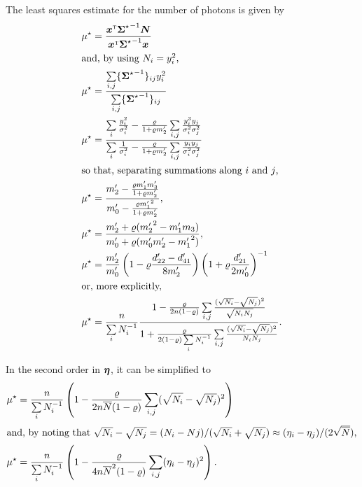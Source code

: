 \documentclass{pasa}
\begin{document}
The least squares estimate for the number of photons is given by
\begin{align*}
    \mu^\star &= \frac { {\boldsymbol{x}}^\text{\textsc{t}}{\ensuremath{\boldsymbol{\Sigma}}^\star}^{-1} \boldsymbol{N} }
                        { {\boldsymbol{x}}^\text{\textsc{t}}{\ensuremath{\boldsymbol{\Sigma}}^\star}^{-1} \boldsymbol{x} }\\
\intertext{and, by using $N_i = y_i^2$,}
    \mu^\star &= \frac{\sum\limits_{i,j} \{ {\boldsymbol{\Sigma}^\star}^{-1} \}_{ij} y_i^2} 
                       {\sum\limits_{i,j} \{ {\boldsymbol{\Sigma}^\star}^{-1} \}_{ij} }\\
    \mu^\star &= \frac{\sum\limits_i \frac{y_i^2}{\sigma_i^2}
                     -  \frac{\varrho}{1+ \varrho m'_2} 
                \sum\limits_{i,j} \frac{y_i^3y_j}{\sigma_i^2\sigma_j^2}}
                  {\sum\limits_i \frac 1{\sigma_i^2}
                     -  \frac{\varrho}{1+ \varrho m'_2} 
                \sum\limits_{i,j} \frac{y_iy_j}{\sigma_i^2\sigma_j^2}}\\
\intertext{so that, separating summations along $i$ and $j$,}
    \mu^\star &= \frac{m'_2 - \frac{\varrho m'_1m'_3}{1 + \varrho m'_2}}
                       {m'_0 - \frac{\varrho {m'_1}^2}{1 + \varrho m'_2}},\\
    \mu^\star &= \frac{m'_2 + \varrho({m'_2}^2 - m'_1m_3)}
                       {m'_0 + \varrho(m'_0m'_2 - {m'_1}^2)},\\
    \mu^\star &= \frac{m'_2}{m'_0} 
                    \left(1 - \varrho\frac{d'_{22} - d'_{41}}{8m'_2}\right)
                    \left(1 + \varrho\frac{d'_{21}}         {2m'_0}\right)^{-1}\\
\intertext{or, more explicitly,}
    \mu^\star &= \frac n{\sum\limits_i N_i^{-1}}
                  \frac{ 
                     1 - \frac{\varrho}{2n(1-\varrho)} 
                     \sum\limits_{i,j} 
                        \frac{(\sqrt{N_i}-\sqrt{N_j})^2}{\sqrt{N_i N_j}} 
                  }{ 1  + \frac{\varrho}{2(1-\varrho)\sum\limits_i N_i^{-1}} 
                     \sum\limits_{i,j} 
                        \frac{(\sqrt{N_i} - \sqrt{N_j})^2}{N_iN_j}}
                                  . 
\end{align*}


In the second order in $\boldsymbol{\eta}$, it can be simplified to
\begin{align*}
   \mu^\star &= \frac n{\sum\limits_i N_i^{-1}}
                    \left( 1 
            - \frac{\varrho}{2n\overline{N}(1-\varrho)} 
                \sum_{i,j} (\sqrt{N_i}-\sqrt{N_j})^2 \right)
\\
\intertext{and, by noting that $\sqrt{N_i} - \sqrt{N_j} = (N_i - Nj) / (\sqrt{N_i} + \sqrt{N_j}) \approx (\eta_i - \eta_j) / (2\sqrt{\overline{N}})$,}
   \mu^\star &= \frac n{\sum\limits_i N_i^{-1}} \left(
                1 - \frac{\varrho}{4n\overline{N}^2(1-\varrho)} 
                \sum_{i,j} (\eta_i - \eta_j)^2 
            \right).
\end{align*}
\end{document}
